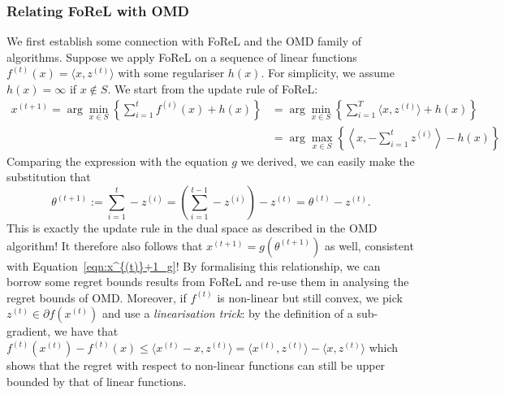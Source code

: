 \subsubsection{Relating FoReL with OMD}\label{sss:forel_OMD_relation}
We first establish some connection with FoReL and the OMD family of algorithms. Suppose we apply FoReL on a sequence of linear functions $f^{(t)}(x) = \langle x, z^{(t)} \rangle$ with some regulariser $h(x)$. For simplicity, we assume $h(x) = \infty$ if $x \notin S$. We start from the update rule of FoReL: \begin{align*}
    x^{(t+1)} = \arg\min_{x \in S} \left\{\sum_{i=1}^t f^{(i)}(x) + h(x) \right\} &= \arg\min_{x \in S} \left\{\sum_{i=1}^T \langle x, z^{(t)} \rangle  + h(x)\right\} \\&= \arg\max_{x \in S} \left\{\left\langle x, -\sum_{i=1}^t z^{(i)} \right\rangle - h(x)\right\}
\end{align*}
Comparing the expression with the equation $g$ we derived, we can easily make the substitution that 
\begin{equation}\label{eqn:theta_update_omd}
    \theta^{(t+1)} := \sum_{i=1}^t -z^{(i)} = \left(\sum_{i=1}^{t-1}-z^{(i)}\right) - z^{(t)} = \theta^{(t)} - z^{(t)}.
\end{equation}
This is exactly the update rule in the dual space as described in the OMD algorithm! It therefore also follows that $x^{(t+1)} = g(\theta^{(t+1)})$ as well, consistent with Equation~\ref{eqn:x^{(t)}+1_g}! By formalising this relationship, we can borrow some regret bounds results from FoReL and re-use them in analysing the regret bounds of OMD. Moreover, if $f^{(t)}$ is non-linear but still convex, we pick $z^{(t)} \in \partial f(x^{(t)})$ and use a \textit{linearisation trick}: by the definition of a sub-gradient, we have that $f^{(t)}(x^{(t)}) - f^{(t)}(x) \leq \langle x^{(t)} - x, z^{(t)} \rangle = \langle x^{(t)}, z^{(t)}\rangle - \langle x, z^{(t)} \rangle$ which shows that the regret with respect to non-linear functions can still be upper bounded by that of linear functions.
